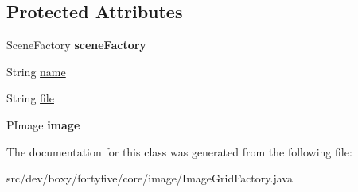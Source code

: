 \subsection*{Protected Attributes}
\begin{DoxyCompactItemize}
\item 
\hypertarget{classdev_1_1boxy_1_1fortyfive_1_1core_1_1image_1_1_image_grid_factory_a1bebfddf7f39928c2bacfee19908b6f3}{
SceneFactory {\bfseries sceneFactory}}
\label{da/dec/classdev_1_1boxy_1_1fortyfive_1_1core_1_1image_1_1_image_grid_factory_a1bebfddf7f39928c2bacfee19908b6f3}

\item 
String \hyperlink{group__images_ga92af5fa9ec1dfb784ba7eb249a3f8314}{name}
\item 
String \hyperlink{group__images_gac0a4aac7b16c874035504c026e244cbe}{file}
\item 
\hypertarget{classdev_1_1boxy_1_1fortyfive_1_1core_1_1image_1_1_image_grid_factory_a5ef7b1ab17d5d5118ca446be0a96d5c0}{
PImage {\bfseries image}}
\label{da/dec/classdev_1_1boxy_1_1fortyfive_1_1core_1_1image_1_1_image_grid_factory_a5ef7b1ab17d5d5118ca446be0a96d5c0}

\end{DoxyCompactItemize}


The documentation for this class was generated from the following file:\begin{DoxyCompactItemize}
\item 
src/dev/boxy/fortyfive/core/image/ImageGridFactory.java\end{DoxyCompactItemize}
